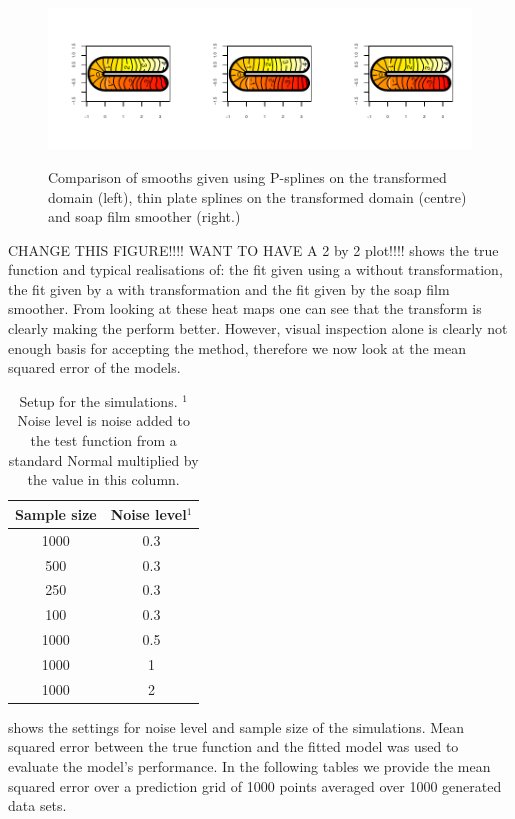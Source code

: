 \begin{figure}
\centering
\includegraphics[trim=0.5in 0.5in 0in 0in]{sc/figs/compsmooth.pdf} \\
\caption{Comparison of smooths given using P-splines on the transformed domain (left), thin plate splines on the transformed domain (centre) and soap film smoother (right.)}
\label{compsmooth}
\end{figure}

CHANGE THIS FIGURE!!!! WANT TO HAVE A 2 by 2 plot!!!!
 shows the true function and typical realisations of: the fit given using a \tprs without transformation, the fit given by a \tprs with transformation and the fit given by the soap film smoother. From looking at these heat maps one can see that the \sch transform is clearly making the \tprs perform better. However, visual inspection alone is clearly not enough basis for accepting the method, therefore we now look at the mean squared error of the models.

\begin{table}[ht]
\begin{tabular}{c c}\\
Sample size & Noise level$^{1}$ \\
\hline
\hline
1000 & 0.3 \\
500 & 0.3 \\
250 & 0.3 \\
100 & 0.3 \\
1000 & 0.5 \\
1000 & 1 \\
1000 & 2 \\
\end{tabular}
\caption{Setup for the simulations. $^{1}$Noise level is noise added to the test function from a standard Normal multiplied by the value in this column.}
\label{scramsimtable}
\end{table}

 shows the settings for noise level and sample size of the simulations. Mean squared error between the true function and the fitted model was used to evaluate the model's performance. In the following tables we provide the mean squared error over a prediction grid of 1000 points averaged over 1000 generated data sets.

